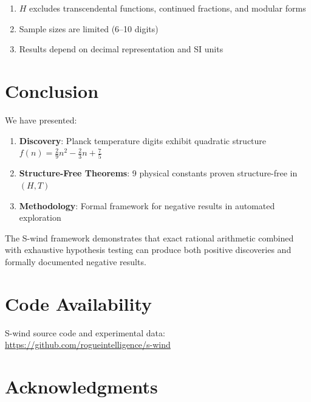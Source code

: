 \documentclass[11pt,a4paper]{article}
\begin{document}
\begin{enumerate}
    \item $H$ excludes transcendental functions, continued fractions, and modular forms
    \item Sample sizes are limited (6--10 digits)
    \item Results depend on decimal representation and SI units
\end{enumerate}

\section{Conclusion}
\label{sec:conclusion}

We have presented:
\begin{enumerate}
    \item \textbf{Discovery}: Planck temperature digits exhibit quadratic structure $f(n) = \frac{2}{9}n^2 - \frac{2}{3}n + \frac{7}{5}$
    \item \textbf{Structure-Free Theorems}: 9 physical constants proven structure-free in $(H, T)$
    \item \textbf{Methodology}: Formal framework for negative results in automated exploration
\end{enumerate}

The S-wind framework demonstrates that exact rational arithmetic combined with exhaustive hypothesis testing can produce both positive discoveries and formally documented negative results.

\section*{Code Availability}

S-wind source code and experimental data: \url{https://github.com/rogueintelligence/s-wind}

\section*{Acknowledgments}
\end{document}
